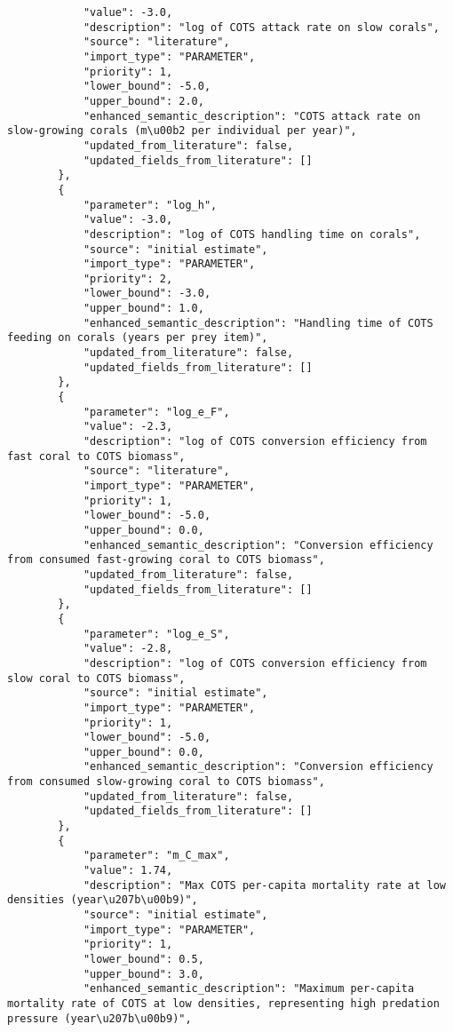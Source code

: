 \begin{lstlisting}
            "value": -3.0,
            "description": "log of COTS attack rate on slow corals",
            "source": "literature",
            "import_type": "PARAMETER",
            "priority": 1,
            "lower_bound": -5.0,
            "upper_bound": 2.0,
            "enhanced_semantic_description": "COTS attack rate on slow-growing corals (m\u00b2 per individual per year)",
            "updated_from_literature": false,
            "updated_fields_from_literature": []
        },
        {
            "parameter": "log_h",
            "value": -3.0,
            "description": "log of COTS handling time on corals",
            "source": "initial estimate",
            "import_type": "PARAMETER",
            "priority": 2,
            "lower_bound": -3.0,
            "upper_bound": 1.0,
            "enhanced_semantic_description": "Handling time of COTS feeding on corals (years per prey item)",
            "updated_from_literature": false,
            "updated_fields_from_literature": []
        },
        {
            "parameter": "log_e_F",
            "value": -2.3,
            "description": "log of COTS conversion efficiency from fast coral to COTS biomass",
            "source": "literature",
            "import_type": "PARAMETER",
            "priority": 1,
            "lower_bound": -5.0,
            "upper_bound": 0.0,
            "enhanced_semantic_description": "Conversion efficiency from consumed fast-growing coral to COTS biomass",
            "updated_from_literature": false,
            "updated_fields_from_literature": []
        },
        {
            "parameter": "log_e_S",
            "value": -2.8,
            "description": "log of COTS conversion efficiency from slow coral to COTS biomass",
            "source": "initial estimate",
            "import_type": "PARAMETER",
            "priority": 1,
            "lower_bound": -5.0,
            "upper_bound": 0.0,
            "enhanced_semantic_description": "Conversion efficiency from consumed slow-growing coral to COTS biomass",
            "updated_from_literature": false,
            "updated_fields_from_literature": []
        },
        {
            "parameter": "m_C_max",
            "value": 1.74,
            "description": "Max COTS per-capita mortality rate at low densities (year\u207b\u00b9)",
            "source": "initial estimate",
            "import_type": "PARAMETER",
            "priority": 1,
            "lower_bound": 0.5,
            "upper_bound": 3.0,
            "enhanced_semantic_description": "Maximum per-capita mortality rate of COTS at low densities, representing high predation pressure (year\u207b\u00b9)",

\end{lstlisting}
